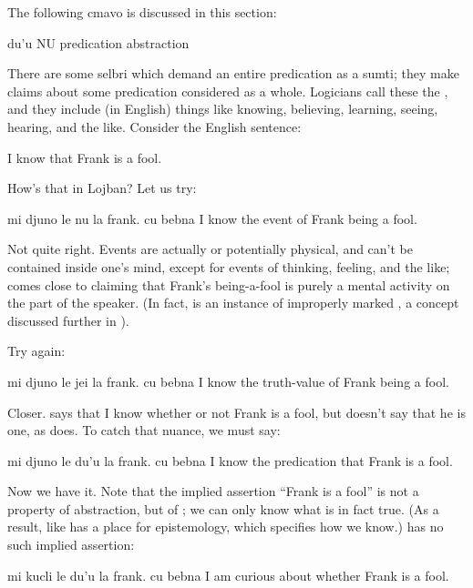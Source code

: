 The following cmavo is discussed in this section:

   du'u    NU  predication abstraction

There are some selbri which demand an entire predication as a
    sumti; they make claims about some predication considered as a
    whole. Logicians call these the ,
    and they include (in English) things like knowing, believing,
    learning, seeing, hearing, and the like. Consider the English
    sentence:
\begin{example}
I know that Frank is a fool.
\end{example}

How's that in Lojban? Let us try:
\begin{example}
mi djuno le nu la frank. cu bebna \n
I know the event of Frank being a fool.
\end{example}

Not quite right. Events are actually or potentially physical,
    and can't be contained inside one's mind, except for events of
    thinking, feeling, and the like;  comes close to claiming that Frank's being-a-fool is
    purely a mental activity on the part of the speaker. (In fact, is an instance of improperly
    marked , a concept discussed further in ). 

Try again:
\begin{example}
mi djuno le jei la frank. cu bebna \n
I know the truth-value of Frank being a fool.
\end{example}

Closer.  says that I know
    whether or not Frank is a fool, but doesn't say that he is one,
    as  does. To catch that nuance,
    we must say:
\begin{example}
mi djuno le du'u la frank. cu bebna \n
I know the predication that Frank is a fool.
\end{example}

Now we have it. Note that the implied assertion ``Frank is a
    fool'' is not a property of  abstraction, but of
    ; we can only know what is in fact true. (As a result,
     like  has a place for epistemology, which
    specifies how we know.)  has no
    such implied assertion:
\begin{example}
mi kucli le du'u la frank. cu bebna \n
I am curious about whether Frank is a fool.
\end{example}

